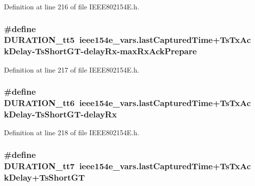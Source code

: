 Definition at line 216 of file I\+E\+E\+E802154\+E.\+h.

\subsubsection[{\texorpdfstring{D\+U\+R\+A\+T\+I\+O\+N\+\_\+tt5}{DURATION_tt5}}]{\setlength{\rightskip}{0pt plus 5cm}\#define D\+U\+R\+A\+T\+I\+O\+N\+\_\+tt5~ieee154e\+\_\+vars.\+last\+Captured\+Time+{\bf Ts\+Tx\+Ack\+Delay}-\/{\bf Ts\+Short\+GT}-\/{\bf delay\+Rx}-\/{\bf max\+Rx\+Ack\+Prepare}}\hypertarget{group___i_e_e_e802154_e_ga11429ea11015c2cf7a473507dcc09afa}{}\label{group___i_e_e_e802154_e_ga11429ea11015c2cf7a473507dcc09afa}


Definition at line 217 of file I\+E\+E\+E802154\+E.\+h.

\subsubsection[{\texorpdfstring{D\+U\+R\+A\+T\+I\+O\+N\+\_\+tt6}{DURATION_tt6}}]{\setlength{\rightskip}{0pt plus 5cm}\#define D\+U\+R\+A\+T\+I\+O\+N\+\_\+tt6~ieee154e\+\_\+vars.\+last\+Captured\+Time+{\bf Ts\+Tx\+Ack\+Delay}-\/{\bf Ts\+Short\+GT}-\/{\bf delay\+Rx}}\hypertarget{group___i_e_e_e802154_e_ga62b9ea793cf243644bfd6ddebf89c998}{}\label{group___i_e_e_e802154_e_ga62b9ea793cf243644bfd6ddebf89c998}


Definition at line 218 of file I\+E\+E\+E802154\+E.\+h.

\subsubsection[{\texorpdfstring{D\+U\+R\+A\+T\+I\+O\+N\+\_\+tt7}{DURATION_tt7}}]{\setlength{\rightskip}{0pt plus 5cm}\#define D\+U\+R\+A\+T\+I\+O\+N\+\_\+tt7~ieee154e\+\_\+vars.\+last\+Captured\+Time+{\bf Ts\+Tx\+Ack\+Delay}+{\bf Ts\+Short\+GT}}\hypertarget{group___i_e_e_e802154_e_ga478a27d87f7fe8e37066ec24d062390f}{}\label{group___i_e_e_e802154_e_ga478a27d87f7fe8e37066ec24d062390f}


